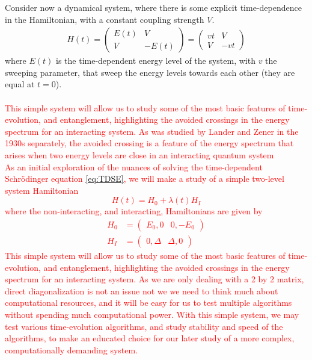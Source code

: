 \documentclass{subfiles}
\begin{document}
Consider now a dynamical system, where there is some explicit time-dependence in the Hamiltonian, with a constant coupling strength $V$.
\begin{align*}
    H(t) = \begin{pmatrix}
        E(t) & V \\
        V & -E(t)
    \end{pmatrix} = \begin{pmatrix}
        vt & V \\
        V & -vt
    \end{pmatrix}
\end{align*}
where $E(t)$ is the time-dependent energy level of the system, with $v$ the sweeping parameter, that sweep the energy levels towards each other (they are equal at $t=0$). 
\\ \\
\textcolor{red}{This simple system will allow us to study some of the most basic features of time-evolution, and entanglement, highlighting the avoided crossings in the energy spectrum for an interacting system. As was studied by Lander and Zener in the 1930s separately, the avoided crossing is a feature of the energy spectrum that arises when two energy levels are close in an interacting quantum system \\
As an initial exploration of the nuances of solving the time-dependent Schrödinger equation \eqref{eq:TDSE}, we will make a study of a simple two-level system Hamiltonian
\begin{equation}
    H(t) = H_0 + \lambda(t)H_I
\end{equation}
where the non-interacting, and interacting, Hamiltonians are given by
\begin{align*}
    H_0 &= \begin{pmatrix}
        E_0, 0 & 0, -E_0
    \end{pmatrix} \\
    H_I &= \begin{pmatrix}
        0, \Delta & \Delta, 0
    \end{pmatrix}
\end{align*}
This simple system will allow us to study some of the most basic features of time-evolution, and entanglement, highlighting the avoided crossings in the energy spectrum for an interacting system. As we are only dealing with a 2 by 2 matrix, direct diagonalization is not an issue not we we need to think much about computational resources, and it will be easy for us to test multiple algorithms without spending much computational power. With this simple system, we may test various time-evolution algorithms, and study stability and speed of the algorithms, to make an educated choice for our later study of a more complex, computationally demanding system.}
\end{document}
